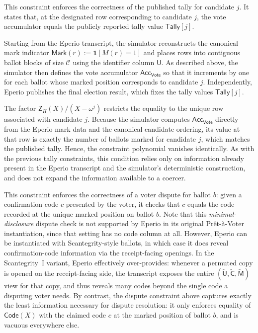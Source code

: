 
This constraint enforces the correctness of the published tally for candidate $j$. It states that, at the designated row
corresponding to candidate $j$, the vote accumulator equals the publicly reported tally value $\mathsf{Tally}[j]$.

Starting from the Eperio transcript, the simulator reconstructs the canonical mark indicator
$\mathsf{Mark}(r):=\mathbf{1}[M(r)=1]$ and places rows into contiguous ballot blocks of size $\mathcal{C}$ using the
identifier column $\mathsf{U}$. As described above, the simulator then defines the vote accumulator
$\mathsf{Acc}_{\mathsf{Vote}}$ so that it increments by one for each ballot whose marked position corresponds to candidate
$j$. Independently, Eperio publishes the final election result, which fixes the tally values $\mathsf{Tally}[j]$.

The factor $\mathsf{Z}_H(X)/(X-\omega^{j})$ restricts the equality to the unique row associated with candidate $j$.
Because the simulator computes $\mathsf{Acc}_{\mathsf{Vote}}$ directly from the Eperio mark data and the canonical
candidate ordering, its value at that row is exactly the number of ballots marked for candidate $j$, which matches the
published tally. Hence, the constraint polynomial vanishes identically. As with the previous tally constraints, this
condition relies only on information already present in the Eperio transcript and the simulator’s deterministic
construction, and does not expand the information available to a coercer.


This constraint enforces the correctness of a voter dispute for ballot $b$: given a confirmation code $c$ presented by the
voter, it checks that $c$ equals the code recorded at the unique marked position on ballot $b$. Note that this
\emph{minimal-disclosure} dispute check is not supported by Eperio in its original Pr\^{e}t-\`a-Voter instantiation,
since that setting has no code column at all. However, Eperio can be instantiated with Scantegrity-style ballots, in
which case it does reveal confirmation-code information via the receipt-facing openings. In the Scantegrity~I variant,
Eperio effectively over-provides: whenever a permuted copy is opened on the receipt-facing side, the transcript exposes
the entire $(\widetilde{\mathsf{U}},\widetilde{\mathsf{C}},\widetilde{\mathsf{M}})$ view for that copy, and thus reveals
many codes beyond the single code a disputing voter needs. By contrast, the dispute constraint above captures exactly the
least information necessary for dispute resolution: it only enforces equality of $\mathsf{Code}(X)$ with the claimed code
$c$ at the marked position of ballot $b$, and is vacuous everywhere else.

